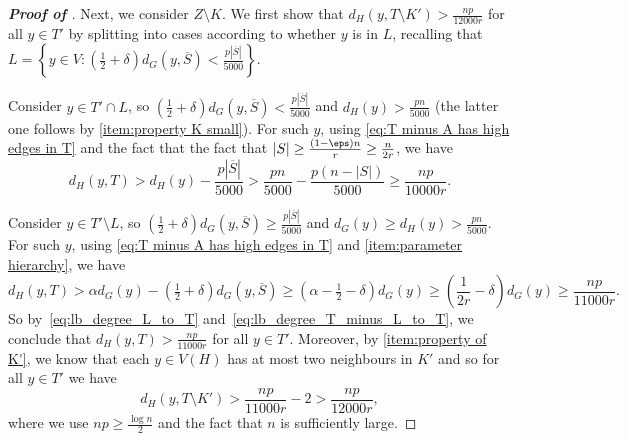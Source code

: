 \documentclass[10pt,a4paper,reqno]{amsart}
\begin{document}
\begin{proof}[\textbf{Proof of }]
Next, we consider $Z \setminus K$. We first show that $d_H(y,T\setminus K') > \frac{np}{12000r}$ for all $y \in T'$ by splitting into cases according to whether $y$ is in $L$, recalling that $L = \left\{y \in V: \left(\tfrac{1}{2}+\delta\right)d_G(y,\overline{S})< \frac{p|\overline{S}|}{5000}\right\}$.

Consider $y \in T' \cap L $, so $(\tfrac{1}{2} + \delta)d_G(y,\overline{S}) < \frac{p|\overline{S}|}{5000}$ and $d_H(y) > \frac{pn}{5000}$ (the latter one follows by \ref{item:property K small}). For such $y$, using \eqref{eq:T minus A has high edges in T} and the fact that the fact that $|S| \ge \frac{(1-\eps)n}{r}\ge \frac{n}{2r}$, we have 
\begin{equation}
d_H(y,T) > d_H(y) - \frac{p|\overline{S}|}{5000} 
> \frac{pn}{5000} - \frac{p(n-|S|)}{5000}
\ge \frac{np}{10000r}.
\label{eq:lb_degree_L_to_T}
\end{equation}

Consider $y \in T'\setminus L $, so $(\tfrac{1}{2} + \delta)d_G(y,\overline{S}) \ge \frac{p|\overline{S}|}{5000}$ and $d_G(y)\ge d_H(y) > \frac{pn}{5000}$. For such $y$, using \eqref{eq:T minus A has high edges in T} and \ref{item:parameter hierarchy}, we have 
\begin{equation}
d_H(y,T) > \alpha d_G(y) - (\tfrac{1}{2} + \delta)d_G(y,\overline{S}) 
\ge \left(\alpha - \tfrac{1}{2} - \delta\right)d_G(y)
\ge \left(\frac{1}{2r} - \delta\right)d_G(y) \ge \frac{np}{11000r}.
\label{eq:lb_degree_T_minus_L_to_T}
\end{equation}
So by~\eqref{eq:lb_degree_L_to_T} and~\eqref{eq:lb_degree_T_minus_L_to_T}, we conclude that $d_H(y,T) > \frac{np}{11000r}$ for all $y \in T'$. Moreover, by \ref{item:property of K'}, we know that each $y \in V(H)$ has at most two neighbours in $K'$ and so for all $y \in T'$ we have
\begin{equation}\label{eq: lower bound to T minus K'}
    d_H(y,T\setminus K') > \frac{np}{11000r} - 2 > \frac{np}{12000r},
\end{equation}
where we use $np \ge \frac{\log{n}}{2}$ and the fact that $n$ is sufficiently large.


\end{proof}
\end{document}
